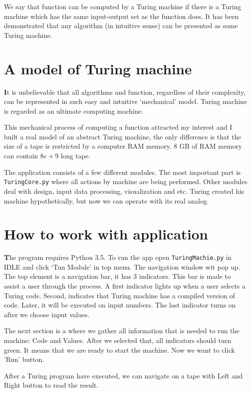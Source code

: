 \documentclass[12pt]{article}
\begin{document}
We say that function can be computed by a Turing machine if there is a Turing machine which has the same input-output set as the function does. It has been demonstrated that any algorithm (in intuitive sense) can be presented as some Turing machine.

\section{A model of Turing machine}
\textbf{\large I}t is unbelievable that all algorithms and function, regardless of their complexity, can be represented in such easy and intuitive `mechanical' model. Turing machine is regarded as an ultimate computing machine.

This mechanical process of computing a function attracted my interest and I built a real model of an abstract Turing machine, the only difference is that the size of a tape is restricted by a computer RAM memory. 8 GB of RAM memory can contain $8e+9$ long tape. 

The application consists of a few different modules. The most important part is \verb|TuringCore.py| where all actions by machine are being performed. Other modules deal with design, input data processing, visualization and etc. Turing created his machine hypothetically, but now we can operate with its real analog.

\section{How to work with application}
\textbf{\large T}he program requires Python 3.5. To run the app open \verb|TuringMachie.py| in IDLE and click `Tun Module' in top menu. The navigation window wit pop up. The top element is a navigation bar, it has 3 indicators. This bar is made to assist a user through the process. A first indicator lights up when a user selects a Turing code. Second, indicates that Turing machine has a compiled version of code. Later, it will be executed on input numbers. The last indicator turns on after we choose input values.

The next section is a where we gather all information that is needed to run the machine: Code and Values. After we selected that, all indicators should turn green. It means that we are ready to start the machine. Now we want to click 'Run' button.

After a Turing program have executed, we can navigate on a tape with Left and Right button to read the result.
\end{document}
